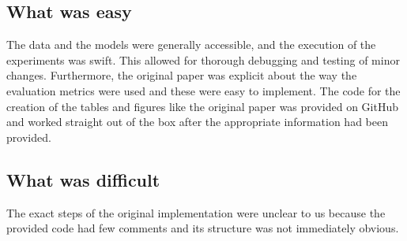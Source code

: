 \subsection{What was easy}




The data and the models were generally accessible, and the execution of the experiments was swift. This allowed for thorough debugging and testing of minor changes. Furthermore, the original paper was explicit about the way the evaluation metrics were used and these were easy to implement. The code for the creation of the tables and figures like the original paper was provided on GitHub and worked straight out of the box after the appropriate information had been provided.

\subsection{What was difficult} \label{sec:difficult}



The exact steps of the original implementation were unclear to us because the provided code had few comments and its structure was not immediately obvious.


